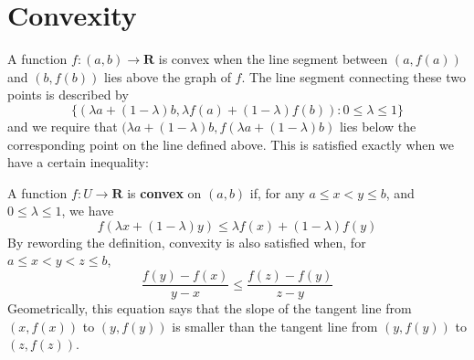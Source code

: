 \section{Convexity}

A function $f:(a,b) \to \mathbf{R}$ is convex when the line segment between $(a,f(a))$ and $(b,f(b))$ lies above the graph of $f$. The line segment connecting these two points is described by
%
\[ \{ (\lambda a + (1 - \lambda) b, \lambda f(a) + (1 - \lambda) f(b)) : 0 \leq \lambda \leq 1 \} \]
%
and we require that $(\lambda a + (1 - \lambda)b, f(\lambda a + (1 - \lambda)b)$ lies below the corresponding point on the line defined above. This is satisfied exactly when we have a certain inequality:

A function $f:U \to \mathbf{R}$ is {\bf convex} on $(a,b)$ if, for any $a \leq x < y \leq b$, and $0 \leq \lambda \leq 1$, we have
    \begin{equation} \label{convex1} f(\lambda x + (1 - \lambda) y) \leq \lambda f(x) + (1 - \lambda) f(y) \end{equation}
    By rewording the definition, convexity is also satisfied when, for $a \leq x < y < z \leq b$,
    \begin{equation} \label{convex2} \frac{f(y) - f(x)}{y - x} \leq \frac{f(z) - f(y)}{z - y} \end{equation}
    Geometrically, this equation says that the slope of the tangent line from $(x, f(x))$ to $(y, f(y))$ is smaller than the tangent line from $(y, f(y))$ to $(z, f(z))$.

